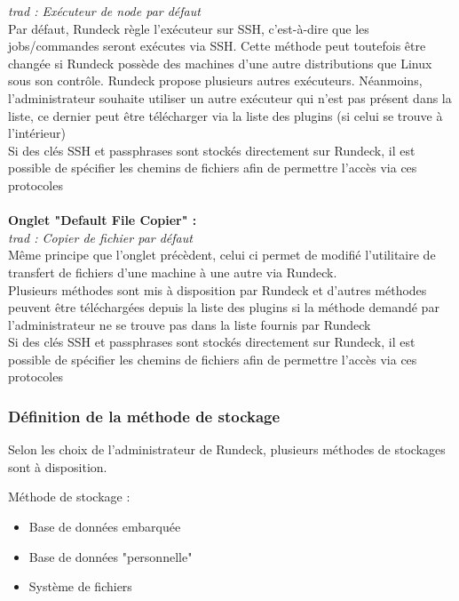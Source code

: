\documentclass[12pt]{article}
\begin{document}
\textit{trad : Exécuteur de node par défaut }
\\
Par défaut, Rundeck règle l'exécuteur sur SSH, c'est-à-dire que les jobs/commandes seront exécutes via SSH. Cette méthode peut toutefois être changée si Rundeck possède des machines d'une autre distributions que Linux sous son contrôle. Rundeck propose plusieurs autres exécuteurs. Néanmoins, l'administrateur souhaite utiliser un autre exécuteur qui n'est pas présent dans la liste, ce dernier peut être télécharger via la liste des plugins (si celui se trouve à l'intérieur)  
\\
Si des clés SSH et passphrases sont stockés directement sur Rundeck, il est possible de spécifier les chemins de fichiers afin de permettre l'accès via ces protocoles
\\
\vspace{0.2cm}
\\
\textbf{Onglet "Default File Copier" :}
\\
\textit{trad : Copier de fichier par défaut}
\\
Même principe que l'onglet précèdent, celui ci permet de modifié l'utilitaire de transfert de fichiers d'une machine à une autre via Rundeck.
\\
Plusieurs méthodes sont mis à disposition par Rundeck et d'autres méthodes peuvent être téléchargées depuis la liste des plugins si la méthode demandé par l'administrateur ne se trouve pas dans la liste fournis par Rundeck
\\
Si des clés SSH et passphrases sont stockés directement sur Rundeck, il est possible de spécifier les chemins de fichiers afin de permettre l'accès via ces protocoles
\\

\subsubsection{Définition de la méthode de stockage}

Selon les choix de l'administrateur de Rundeck, plusieurs méthodes de stockages sont à disposition.

Méthode de stockage :
\begin{itemize}
    \item Base de données embarquée
    \item Base de données "personnelle"
    \item Système de fichiers
\end{itemize}
\end{document}
